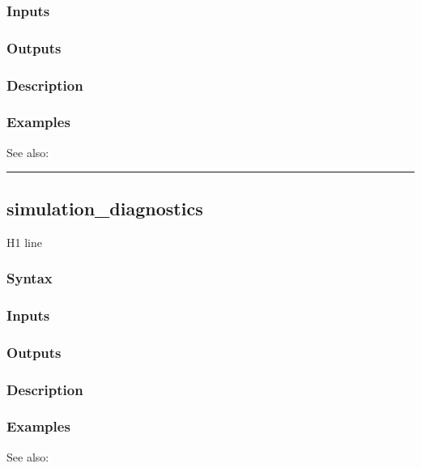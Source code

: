 \documentclass[letterpaper,10pt,english]{sphinxmanual}
\begin{document}
\subsubsection{Inputs}
\label{classes/models/@dsge/dsge:id169}

\subsubsection{Outputs}
\label{classes/models/@dsge/dsge:id170}

\subsubsection{Description}
\label{classes/models/@dsge/dsge:id171}

\subsubsection{Examples}
\label{classes/models/@dsge/dsge:id172}
See also:


\bigskip\hrule{}\bigskip



\subsection{simulation\_diagnostics}
\label{classes/models/@dsge/dsge:simulation-diagnostics}\label{classes/models/@dsge/dsge:id173}
H1 line


\subsubsection{Syntax}
\label{classes/models/@dsge/dsge:id174}

\subsubsection{Inputs}
\label{classes/models/@dsge/dsge:id175}

\subsubsection{Outputs}
\label{classes/models/@dsge/dsge:id176}

\subsubsection{Description}
\label{classes/models/@dsge/dsge:id177}

\subsubsection{Examples}
\label{classes/models/@dsge/dsge:id178}
See also:
\end{document}

